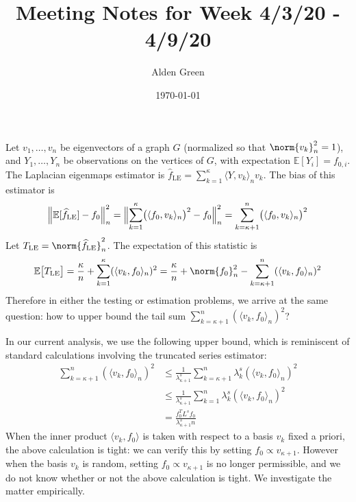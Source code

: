 \documentclass{article}
\newcommand{\1}{\mathbf{1}}
\newcommand{\Ebb}{\mathbb{E}}
\newcommand{\dotp}[2]{\langle #1, #2 \rangle}
\newcommand{\wh}[1]{\widehat{#1}}
\newcommand{\LE}{\mathrm{LE}}
\theoremstyle{alden}
\theoremstyle{aldenthm}
\theoremstyle{definition}
\theoremstyle{remark}
\begin{document}
\title{Meeting Notes for Week 4/3/20 - 4/9/20}
\author{Alden Green}
\date{\today}
\maketitle

Let $v_1,\ldots,v_n$ be eigenvectors of a graph $G$ (normalized so that $\norm{v_k}_n^2 = 1$), and $Y_1,\ldots,Y_n$ be observations on the vertices of $G$, with expectation $\Ebb[Y_i] = f_{0,i}$. The Laplacian eigenmaps estimator is $\wh{f}_{\LE} = \sum_{k = 1}^{\kappa} \dotp{Y}{v_k}_n v_k$. The bias of this estimator is 
\begin{equation*}
\Bigl\|\Ebb[\wh{f}_{\LE}] - f_0\Bigr\|_n^2 = \Bigl\|\sum_{k = 1}^{\kappa} \bigl(\dotp{f_0}{v_k}_n\bigr)^2 - f_0\Bigr\|_n^2 = \sum_{k = \kappa + 1}^{n} \bigl(\dotp{f_0}{v_k}_n\bigr)^2
\end{equation*}
Let $T_{\LE} = \norm{\wh{f}_{\LE}}_n^2$. The expectation of this statistic is
\begin{equation*}
\Ebb\bigl[T_{\LE}\bigr] = \frac{\kappa}{n} + \sum_{k = 1}^{\kappa} (\dotp{v_k}{f_0}_n)^2 = \frac{\kappa}{n} + \norm{f_0}_n^2 - \sum_{k = \kappa + 1}^{n} (\dotp{v_k}{f_0}_n)^2
\end{equation*}
Therefore in either the testing or estimation problems, we arrive at the same question: how to upper bound the tail sum $\sum_{k = \kappa + 1}^{n} (\dotp{v_k}{f_0}_n)^2$? 

In our current analysis, we use the following upper bound, which is reminiscent of standard calculations involving the truncated series estimator:
\begin{align}
\sum_{k = \kappa + 1}^{n} (\dotp{v_k}{f_0}_n)^2 & \leq \frac{1}{\lambda_{\kappa + 1}^s} \sum_{k = \kappa + 1}^{n} \lambda_k^s (\dotp{v_k}{f_0}_n)^2 \nonumber \\
& \leq \frac{1}{\lambda_{\kappa + 1}^s} \sum_{k = 1}^{n} \lambda_k^s (\dotp{v_k}{f_0}_n)^2 \nonumber \\
& = \frac{f_0^T L^s f_0}{\lambda_{\kappa + 1}^s n} \label{eqn:approximation_error_bound}
\end{align} 
When the inner product $\dotp{v_k}{f_0}$ is taken with respect to a basis $v_k$ fixed a priori, the above calculation is tight: we can verify this by setting $f_0 \propto v_{\kappa + 1}$. However when the basis $v_{k}$ is random, setting $f_0 \propto v_{\kappa + 1}$ is no longer permissible, and we do not know whether or not the above calculation is tight. We investigate the matter empirically. 
\end{document}
